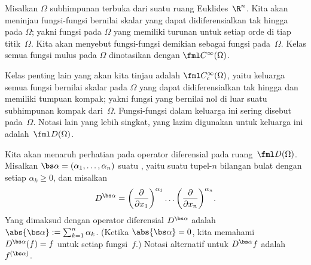 \begin{notn}\label{mi_notn} Misalkan $\Omega$ subhimpunan terbuka dari suatu ruang Euklides~$\R^n$. Kita akan meninjau
fungsi-fungsi bernilai skalar yang dapat didiferensialkan
tak hingga pada $\Omega$; yakni fungsi pada $\Omega$ yang memiliki turunan untuk setiap orde di tiap titik~$\Omega$. Kita
akan menyebut fungsi-fungsi demikian sebagai
fungsi  pada~$\Omega$. Kelas semua fungsi mulus pada $\Omega$ dinotasikan dengan
$\fml C^\infty(\Omega)$.

Kelas penting lain yang akan kita tinjau
adalah $\fml C_c^\infty(\Omega)$, yaitu keluarga semua fungsi bernilai skalar pada $\Omega$ yang dapat didiferensialkan tak hingga dan memiliki tumpuan kompak;
yakni fungsi yang bernilai nol di luar suatu subhimpunan kompak dari~$\Omega$. Fungsi-fungsi dalam keluarga ini sering disebut
 pada~$\Omega$. Notasi lain yang lebih singkat,
yang lazim digunakan untuk keluarga ini adalah~$\fml D(\Omega)$.

Kita akan menaruh perhatian pada operator diferensial pada ruang~$\fml D(\Omega)$. Misalkan $\bs\alpha = (\alpha_1, \dots, \alpha_n)$ suatu
, yaitu suatu tupel-$n$ bilangan bulat dengan setiap $\alpha_k \ge 0$, dan misalkan
  \[ D^{\bs\alpha} = \biggl(\frac{\partial}{\partial x_1}\biggr)^{\alpha_1} \dots
                                                     \biggl(\frac{\partial}{\partial x_n}\biggr)^{\alpha_n}. \]
Yang dimaksud dengan
%
 operator diferensial $D^{\bs\alpha}$ adalah $\abs{\bs\alpha} := \sum_{k=1}^n \alpha_k$. (Ketika
$\abs{\bs\alpha} = 0$, kita memahami $D^{\bs\alpha}(f) = f$ untuk setiap fungsi~$f$.) Notasi alternatif untuk
$D^{\bs\alpha}f$ adalah~$f^{(\bs\alpha)}$.
\end{notn}

